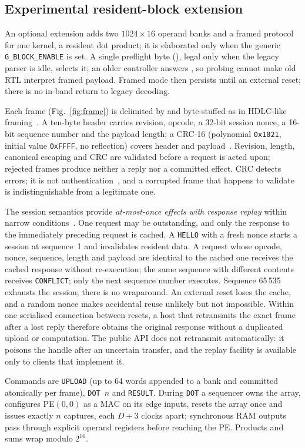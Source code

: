 \subsection{Experimental resident-block extension}
\label{sec:blocks}

An optional extension adds two $1024\times16$ operand banks and a framed
protocol for one kernel, a resident dot product; it is elaborated only when
the generic \texttt{G\_BLOCK\_ENABLE} is set. A single preflight byte (), legal only
when the legacy parser is idle, selects it; an older controller answers
, so probing cannot make old RTL interpret framed payload. Framed
mode then persists until an external reset; there is no in-band return to
legacy decoding.

Each frame (Fig.~\ref{fig:frame}) is delimited by  and
byte-stuffed as in HDLC-like framing~\cite{rfc1662}. A ten-byte header
carries revision, opcode, a 32-bit session nonce, a 16-bit sequence number
and the payload length; a CRC-16 (polynomial \texttt{0x1021}, initial value
\texttt{0xFFFF}, no reflection) covers header and
payload~\cite{peterson-crc,koopman-crc}. Revision, length, canonical escaping
and CRC are validated before a request is acted upon; rejected frames
produce neither a reply nor a committed effect. CRC detects errors; it is
not authentication~\cite{end-to-end}, and a corrupted frame that happens to
validate is indistinguishable from a legitimate one.

The session semantics provide \emph{at-most-once effects with response
replay} within narrow conditions~\cite{birrell-rpc}. One request may be
outstanding, and only the response to the immediately preceding request is
cached. A \texttt{HELLO} with a fresh nonce starts a session at sequence~1
and invalidates resident data. A request whose opcode, nonce, sequence,
length and payload are identical to the cached one receives the cached
response without re-execution; the same sequence with different contents
receives \texttt{CONFLICT}; only the next sequence number executes. Sequence
65\,535 exhausts the session; there is no wraparound. An external reset
loses the cache, and a random nonce makes accidental reuse unlikely but not
impossible. Within one serialised connection between resets, a host that
retransmits the exact frame after a lost reply therefore obtains the
original response without a duplicated upload or computation. The public
API does not retransmit automatically: it poisons the handle after an
uncertain transfer, and the replay facility is available only to clients
that implement it.

Commands are \texttt{UPLOAD} (up to 64 words appended to a bank and
committed atomically per frame), \texttt{DOT}~$n$ and \texttt{RESULT}. During
\texttt{DOT} a sequencer owns the array, configures PE$(0,0)$ as a MAC on
its edge inputs, resets the array once and issues exactly $n$ captures, each
$D+3$ clocks apart; synchronous RAM outputs pass through explicit operand
registers before reaching the PE. Products and sums wrap modulo $2^{16}$.


